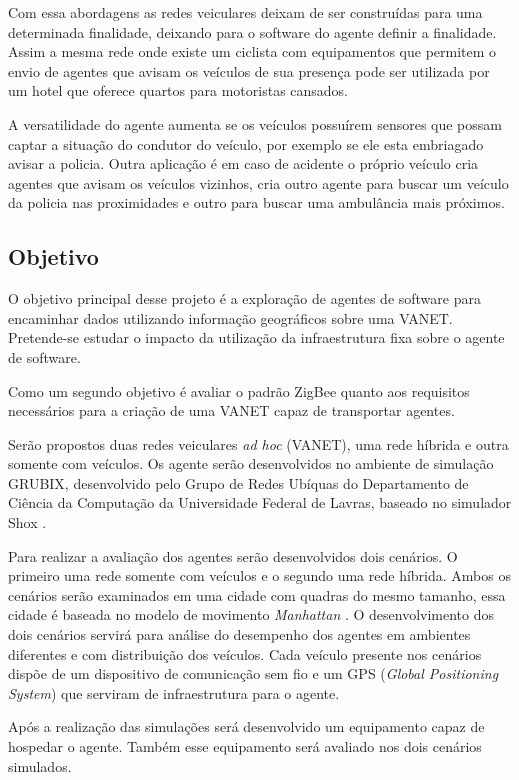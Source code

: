 Com essa abordagens as redes veiculares deixam de ser construídas para uma determinada finalidade, deixando para o software do agente definir a finalidade. Assim a mesma rede onde existe um ciclista com equipamentos que permitem o envio de agentes que avisam os veículos de sua presença pode ser utilizada por um hotel que oferece quartos para motoristas cansados. 

A versatilidade do agente aumenta se os veículos possuírem sensores que possam captar a situação do condutor do veículo, por exemplo se ele esta embriagado avisar a policia. Outra aplicação é em caso de acidente o próprio veículo cria agentes que avisam os veículos vizinhos, cria outro agente para buscar um veículo da policia nas proximidades e outro para buscar uma ambulância mais próximos.   

\subsection{Objetivo}

O objetivo principal desse projeto é a exploração de agentes de software para encaminhar dados utilizando informação geográficos sobre uma VANET. Pretende-se estudar o impacto da utilização da infraestrutura fixa sobre o agente de software.

Como um segundo objetivo é avaliar o padrão ZigBee quanto aos requisitos necessários para a criação de uma VANET capaz de transportar agentes. 

Serão propostos duas redes veiculares \emph{ad hoc} (VANET), uma rede híbrida e outra somente com veículos. Os agente serão desenvolvidos no ambiente de simulação GRUBIX, desenvolvido pelo Grupo de Redes Ubíquas do Departamento de Ciência da Computação da Universidade Federal de Lavras, baseado no simulador Shox \cite{Lessmann:2008}.

Para realizar a avaliação dos agentes serão desenvolvidos dois cenários. O primeiro uma rede somente com veículos e o segundo uma rede híbrida. Ambos os cenários serão examinados em uma cidade com quadras do mesmo tamanho, essa cidade é baseada no modelo de movimento \emph{Manhattan} \cite{Bai:2003}. O desenvolvimento dos dois cenários servirá para análise do desempenho dos agentes em ambientes diferentes e com distribuição dos veículos. Cada veículo presente nos cenários dispõe de um dispositivo de comunicação sem fio e um GPS (\emph{Global Positioning System}) que serviram de infraestrutura para o agente. 

Após a realização das simulações será desenvolvido um equipamento capaz de hospedar o agente. Também esse equipamento será avaliado nos dois cenários simulados.  

